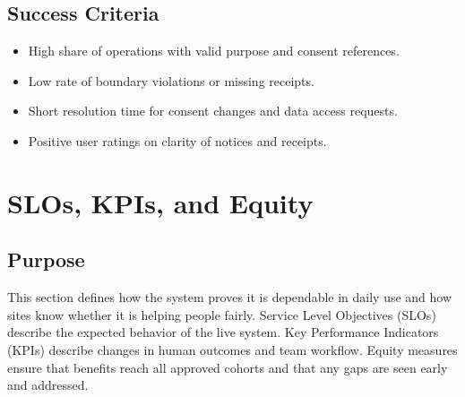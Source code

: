 \documentclass[12pt]{article}
\begin{document}
\subsection*{Success Criteria}
\begin{itemize}[leftmargin=*]
  \item High share of operations with valid purpose and consent references.
  \item Low rate of boundary violations or missing receipts.
  \item Short resolution time for consent changes and data access requests.
  \item Positive user ratings on clarity of notices and receipts.
\end{itemize}



\section{SLOs, KPIs, and Equity}

\subsection*{Purpose}
This section defines how the system proves it is dependable in daily use and how sites know whether it is helping people fairly. Service Level Objectives (SLOs) describe the expected behavior of the live system. Key Performance Indicators (KPIs) describe changes in human outcomes and team workflow. Equity measures ensure that benefits reach all approved cohorts and that any gaps are seen early and addressed.
\end{document}
